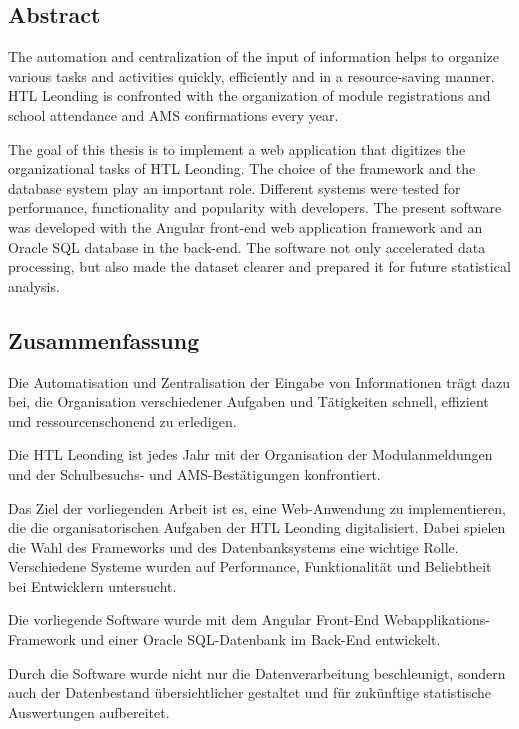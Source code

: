 \begin{spacing}{1}
    \chapter*{Abstract}
\end{spacing}
The automation and centralization of the input of information helps to organize various tasks and activities quickly,
efficiently and in a resource-saving manner. 
HTL Leonding is confronted with the organization of module registrations and school attendance and AMS confirmations every year. 


The goal of this thesis is to implement a web application that digitizes the organizational tasks of HTL Leonding.
The choice of the framework and the database system play an important role. Different systems were tested for performance,
functionality and popularity with developers. 
The present software was developed with the Angular front-end web application framework and an Oracle SQL database in the back-end. 
The software not only accelerated data processing, but also made the dataset clearer and prepared it for future statistical analysis.

\newpage
\begin{spacing}{1}
    \chapter*{Zusammenfassung}
\end{spacing}
\begin{wrapfigure}{r}{0.3\textwidth}
\end{wrapfigure}
Die Automatisation und Zentralisation der Eingabe von Informationen trägt dazu bei, die Organisation verschiedener Aufgaben und Tätigkeiten schnell,
effizient und ressourcenschonend zu erledigen. 

Die HTL Leonding ist jedes Jahr mit der Organisation der Modulanmeldungen und der Schulbesuchs- und AMS-Bestätigungen konfrontiert. 

Das Ziel der vorliegenden Arbeit ist es, eine Web-Anwendung zu implementieren, die die organisatorischen Aufgaben der HTL Leonding digitalisiert.
Dabei spielen die Wahl des Frameworks und des Datenbanksystems eine wichtige Rolle. Verschiedene Systeme wurden auf Performance, Funktionalität und Beliebtheit bei Entwicklern untersucht. 

Die vorliegende Software wurde mit dem Angular Front-End Webapplikations-Framework und einer Oracle SQL-Datenbank im Back-End entwickelt. 

Durch die Software wurde nicht nur die Datenverarbeitung beschleunigt, sondern auch der Datenbestand übersichtlicher gestaltet und für zukünftige statistische Auswertungen aufbereitet.


